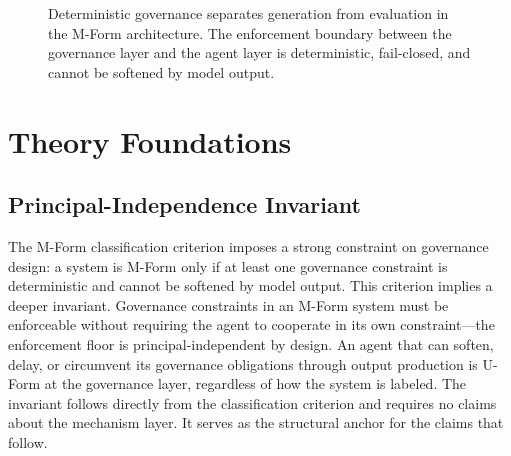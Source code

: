\documentclass[11pt]{article}
\begin{document}
\begin{figure}[t]
\centering
{}
\caption{Deterministic governance separates generation from evaluation in the M-Form architecture. The enforcement boundary between the governance layer and the agent layer is deterministic, fail-closed, and cannot be softened by model output.}
\label{fig:architecture}
\end{figure}


\section{Theory Foundations}

\subsection{Principal-Independence Invariant}

The M-Form classification criterion imposes a strong constraint on governance design: a system is M-Form only if at least one governance constraint is deterministic and cannot be softened by model output. This criterion implies a deeper invariant. Governance constraints in an M-Form system must be enforceable without requiring the agent to cooperate in its own constraint---the enforcement floor is principal-independent by design. An agent that can soften, delay, or circumvent its governance obligations through output production is U-Form at the governance layer, regardless of how the system is labeled. The invariant follows directly from the classification criterion and requires no claims about the mechanism layer. It serves as the structural anchor for the claims that follow.
\end{document}
